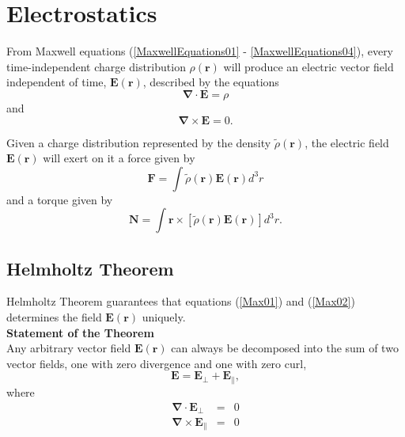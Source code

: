\chapter{Electrostatics}

From Maxwell equations (\ref{MaxwellEquations01} - \ref{MaxwellEquations04}), every time-independent charge distribution $\rho (\textbf{r})$ will produce an electric vector field independent of time, $\textbf{E} (\textbf{r})$, described by the equations
\begin{equation}
\boldsymbol{\nabla} \cdot \textbf{E} = \rho \label{Max01}
\end{equation}
and
\begin{equation}
\boldsymbol{\nabla} \times \textbf{E} = 0. \label{Max02}
\end{equation}

Given a charge distribution represented by the density $\tilde{\rho} (\textbf{r}) $, the electric field $\textbf{E}(\textbf{r})$ will exert on it a force given by 
\begin{equation}
\textbf{F} = \int \tilde{\rho} (\textbf{r}) \textbf{E}(\textbf{r}) d^3 r
\end{equation}
and a torque given by
\begin{equation}
\textbf{N} = \int \textbf{r} \times \left[ \tilde{\rho} (\textbf{r}) \textbf{E}(\textbf{r}) \right] d^3 r.
\end{equation}

\section{Helmholtz Theorem}

Helmholtz Theorem guarantees that equations (\ref{Max01}) and (\ref{Max02}) determines the field $\textbf{E} (\textbf{r})$ uniquely. \\

\textbf{Statement of the Theorem}\\

Any arbitrary vector field $\textbf{E}(\textbf{r})$ can always be decomposed into the sum of two vector fields, one with zero divergence and one with zero curl,
\begin{equation}
\textbf{E} = \textbf{E}_\bot + \textbf{E}_\| ,
\end{equation}
where 
\begin{eqnarray}
\boldsymbol{\nabla} \cdot \textbf{E}_\bot &=& 0\\
\boldsymbol{\nabla} \times \textbf{E}_\| &=& 0
\end{eqnarray}

